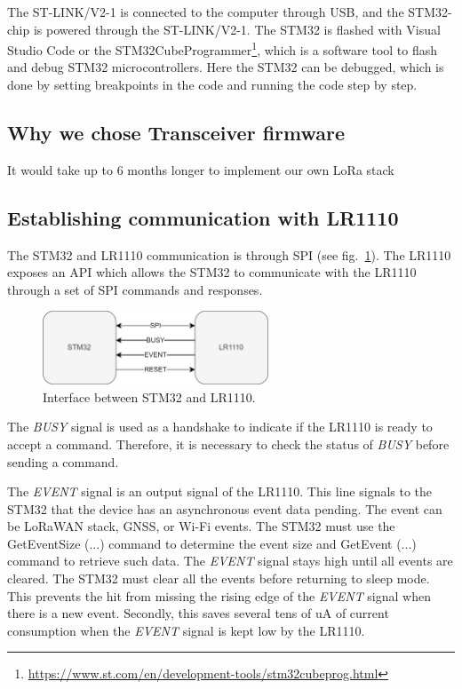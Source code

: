 The ST-LINK/V2-1 is connected to the computer through \ac{USB}, and the STM32-chip is powered through the ST-LINK/V2-1. The STM32 is flashed with Visual Studio Code or the STM32CubeProgrammer\footnote{\url{https://www.st.com/en/development-tools/stm32cubeprog.html}}, which is a software tool to flash and debug STM32 microcontrollers. Here the STM32 can be debugged, which is done by setting breakpoints in the code and running the code step by step.

\subsection{Why we chose Transceiver firmware}
It would take up to 6 months longer to implement our own \ac{LoRa} stack

\subsection{Establishing communication with LR1110}

The STM32 and LR1110 communication is through \ac{SPI} (see fig.~\ref{fig:stm32_lr1110_interface}). The LR1110 exposes an \ac{API} which allows the STM32 to communicate with the LR1110 through a set of \ac{SPI} commands and responses.

\begin{figure}[H]
    \centering
    \includegraphics[width=0.6\textwidth]{figures/STM32_LR1110_interface.png}
    \caption{Interface between STM32 and LR1110.}
    \label{fig:stm32_lr1110_interface}
\end{figure}

The \textit{BUSY} signal is used as a handshake to indicate if the LR1110 is ready to accept a command. Therefore, it is necessary to check the status of \textit{BUSY} before sending a command.

The \textit{EVENT} signal is an output signal of the LR1110. This line signals to the STM32 that the device has an asynchronous event data pending. The event can be \ac{LoRaWAN} stack, \ac{GNSS}, or Wi-Fi events. The STM32 must use the GetEventSize (...) command to determine the event size and GetEvent (...) command to retrieve such data.
The \textit{EVENT} signal stays high until all events are cleared. The STM32 must clear all the events before returning to sleep mode. This prevents the hit from missing the rising edge of the \textit{EVENT} signal when there is a new event. Secondly, this saves several tens of uA of current consumption when the \textit{EVENT} signal is kept low by the LR1110.

